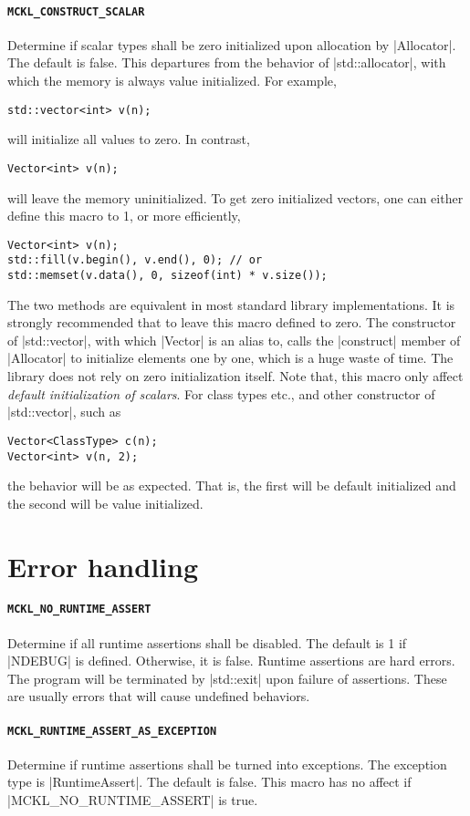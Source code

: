 \paragraph{\texttt{MCKL\_CONSTRUCT\_SCALAR}} Determine if scalar types shall be
zero initialized upon allocation by |Allocator|. The default is false. This
departures from the behavior of |std::allocator|, with which the memory is
always value initialized. For example,
\begin{Verbatim}
std::vector<int> v(n);
\end{Verbatim}
will initialize all values to zero. In contrast,
\begin{Verbatim}
Vector<int> v(n);
\end{Verbatim}
will leave the memory uninitialized. To get zero initialized vectors, one can
either define this macro to 1, or more efficiently,
\begin{Verbatim}
Vector<int> v(n);
std::fill(v.begin(), v.end(), 0); // or
std::memset(v.data(), 0, sizeof(int) * v.size());
\end{Verbatim}
The two methods are equivalent in most standard library implementations. It is
strongly recommended that to leave this macro defined to zero. The constructor
of |std::vector|, with which |Vector| is an alias to, calls the |construct|
member of |Allocator| to initialize elements one by one, which is a huge waste
of time. The library does not rely on zero initialization itself. Note that,
this macro only affect \emph{default initialization of scalars}. For class
types etc., and other constructor of |std::vector|, such as
\begin{Verbatim}
Vector<ClassType> c(n);
Vector<int> v(n, 2);
\end{Verbatim}
the behavior will be as expected. That is, the first will be default
initialized and the second will be value initialized.

\section{Error handling}
\label{sec:Error handling}

\paragraph{\texttt{MCKL\_NO\_RUNTIME\_ASSERT}} Determine if all runtime
assertions shall be disabled. The default is 1 if |NDEBUG| is defined.
Otherwise, it is false. Runtime assertions are hard errors. The program will be
terminated by |std::exit| upon failure of assertions. These are usually errors
that will cause undefined behaviors.

\paragraph{\texttt{MCKL\_RUNTIME\_ASSERT\_AS\_EXCEPTION}} Determine if runtime
assertions shall be turned into exceptions. The exception type is
|RuntimeAssert|. The default is false. This macro has no affect if
|MCKL_NO_RUNTIME_ASSERT| is true.

